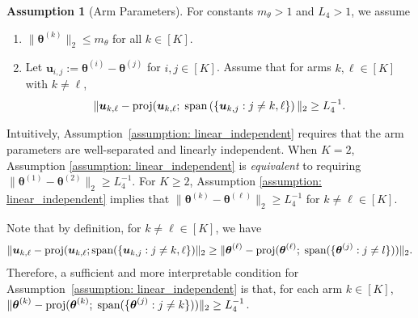 \documentclass[aos,preprint]{imsart}
\theoremstyle{plain}
\theoremstyle{definition}
\newtheorem{assumption}{Assumption}
\newcommand{\btheta}{\boldsymbol{\theta}}
\newcommand{\bu}{\boldsymbol{u}}
\begin{document}
\begin{assumption}[Arm Parameters] \label{assumption:arm_parameters}
For constants $m_{\theta} > 1$ and $L_4 > 1$, we assume
\begin{enumerate}[label={(\alph*)}, ref={\theassumption\ (\alph*)}]
\item \label{assumption: theta_bound}
$\|\btheta^{(k)}\|_2\le m_{\theta}$ for all $k\in [K]$.

\item \label{assumption: linear_independent}
Let $\bu_{i,j} := \btheta^{(i)}-\btheta^{(j)}$ for $i,j\in[K]$. Assume that for arms $k,\ell \in [K]$ with $k \neq \ell$, 
$$
\|\bu_{k,\ell}-\textup{proj}(\bu_{k,\ell};\;\textup{span}\left(\{\bu_{k,j}:j\neq k,\ell\}\right)\|_2\ge L_4^{-1}.
$$
\end{enumerate}
\end{assumption}


Intuitively, Assumption~\ref{assumption: linear_independent} requires that the arm parameters are well-separated and linearly independent.  When $K=2$,   Assumption \ref{assumption: linear_independent} is \textit{equivalent} to requiring $\|\btheta^{(1)}  - \btheta^{(2)}\|_2 \geq L_4^{-1}$. For $K \geq 2$, Assumption \ref{assumption: linear_independent} implies that $\|\btheta^{(k)}  - \btheta^{(\ell)}\|_2 \geq L_4^{-1}$ for $k \neq \ell \in [K]$. 

Note that by definition, for $k \neq \ell \in [K]$, we have
\begin{align*}
\|\bu_{k,\ell}-\textup{proj}(\bu_{k,\ell};\textup{span}(\{\bu_{k,j}:j\neq k,\ell\})\|_2 \ge \|\btheta^{(\ell)}-\textup{proj}(\btheta^{(\ell)};\; \textup{span}(\{\btheta^{(j)}:j\neq l\}))\|_2.
\end{align*}
Therefore, a sufficient and more interpretable condition for Assumption~\ref{assumption: linear_independent} is that, for each arm $k \in [K]$, $\|\btheta^{(k)}-\textup{proj}(\btheta^{(k)};\; \textup{span}(\{\btheta^{(j)}:j\neq k\}))\|_2\ge L_4^{-1}$.

\end{document}
